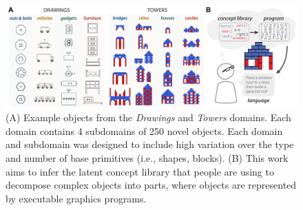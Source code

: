\documentclass[10pt,letterpaper]{article}
\begin{document}



\begin{figure}[ht!]
  \begin{center}
  \includegraphics[width=1.02\linewidth]{figures/lax_task.pdf}
  \caption{(A) Example objects from the \textit{Drawings} and \textit{Towers} domains. Each domain contains 4 subdomains of 250 novel objects. Each domain and subdomain was designed to include high variation over the type and number of base primitives (i.e., shapes, blocks). (B) This work aims to infer the latent concept library that people are using to decompose complex objects into parts, where objects are represented by executable graphics programs.}
  \label{fig:task}
  \end{center}
 \end{figure}
\end{document}

